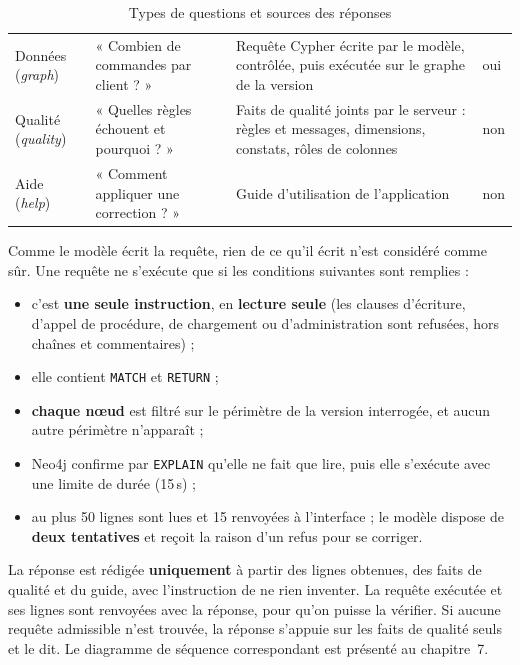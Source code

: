 \begin{table}[H]
\centering
\small
\begin{tabular}{|L{1.8cm}|L{4.6cm}|L{5cm}|C{1.6cm}|}
\hline
{} &  &  &  \\ \hline
Données (\textit{graph}) & « Combien de commandes par client ? » & Requête Cypher écrite par le modèle, contrôlée, puis exécutée sur le graphe de la version & oui \\ \hline
Qualité (\textit{quality}) & « Quelles règles échouent et pourquoi ? » & Faits de qualité joints par le serveur : règles et messages, dimensions, constats, rôles de colonnes & non \\ \hline
Aide (\textit{help}) & « Comment appliquer une correction ? » & Guide d'utilisation de l'application & non \\ \hline
\end{tabular}
\caption{Types de questions et sources des réponses}
\label{tab:types-questions}
\end{table}

Comme le modèle écrit la requête, rien de ce qu'il écrit n'est considéré comme sûr. Une requête ne s'exécute que si les conditions suivantes sont remplies :
\begin{itemize}
  \item c'est \textbf{une seule instruction}, en \textbf{lecture seule} (les clauses d'écriture, d'appel de procédure, de chargement ou d'administration sont refusées, hors chaînes et commentaires) ;
  \item elle contient \texttt{MATCH} et \texttt{RETURN} ;
  \item \textbf{chaque nœud} est filtré sur le périmètre de la version interrogée, et aucun autre périmètre n'apparaît ;
  \item Neo4j confirme par \texttt{EXPLAIN} qu'elle ne fait que lire, puis elle s'exécute avec une limite de durée (15\,s) ;
  \item au plus 50 lignes sont lues et 15 renvoyées à l'interface ; le modèle dispose de \textbf{deux tentatives} et reçoit la raison d'un refus pour se corriger.
\end{itemize}
La réponse est rédigée \textbf{uniquement} à partir des lignes obtenues, des faits de qualité et du guide, avec l'instruction de ne rien inventer. La requête exécutée et ses lignes sont renvoyées avec la réponse, pour qu'on puisse la vérifier. Si aucune requête admissible n'est trouvée, la réponse s'appuie sur les faits de qualité seuls et le dit. Le diagramme de séquence correspondant est présenté au chapitre~7.

